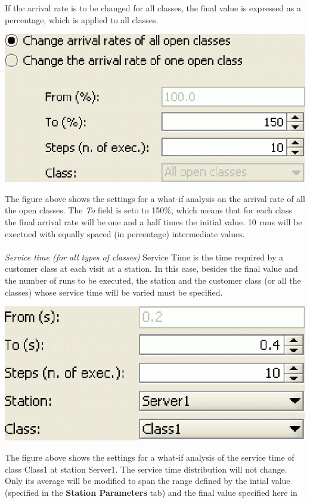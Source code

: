 \begin{description*}
If the arrival rate is to be changed for all classes, the final value is expressed as a percentage, which is applied to all classes.
\begin{center}
\includegraphics[scale=.5]{img/jsim/ex1.eps}
\end{center}
The figure above shows the settings for a what-if analysis on the arrival rate of all the open classes. The \emph{To} field is seto to 150\%, which means that for each class the final arrival rate will be one and a half times the initial value. 10 runs will be exectued with equally spaced (in percentage) intermediate values.\\\\
\textit{Service time (for all types of classes)}
Service Time is the time required by a customer class at each visit at a station. In this case, besides the final value and the number of runs to be executed, the station and the customer class (or all the classes) whose service time will be varied must be specified.
\begin{center}
\includegraphics[scale=.5]{img/jsim/ex2_service_time.eps}
\end{center}
The figure above shows the settings for a what-if analysis of the service time of class Class1 at station Server1. The service time distribution will not change. Only its average will be modified to span the range defined by the intial value (specified in the \textbf{Station Parameters} tab) and the final value specified here in

\end{description*}
